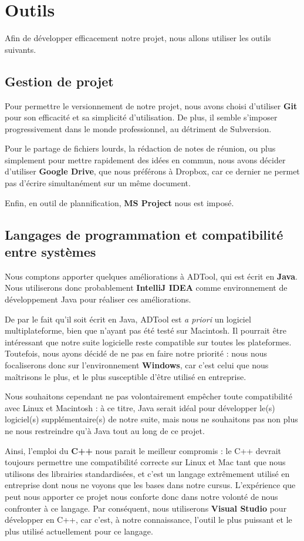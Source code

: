 \section{Outils}
	Afin de développer efficacement notre projet, nous allons utiliser les outils suivants.
	 
	\subsection{Gestion de projet}
		Pour permettre le versionnement de notre projet, nous avons choisi d'utiliser {\bf Git} pour son efficacité et sa simplicité d'utilisation. De plus, il semble s'imposer progressivement dans le monde professionnel, au détriment de Subversion.
		
		Pour le partage de fichiers lourds, la rédaction de notes de réunion, ou plus simplement pour mettre rapidement des idées en commun, nous avons décider d'utiliser {\bf Google Drive}, que nous préférons à Dropbox, car ce dernier ne permet pas d'écrire simultanément sur un même document.

		Enfin, en outil de plannification, {\bf MS Project} nous est imposé.

	\subsection{Langages de programmation et compatibilité entre systèmes}
		Nous comptons apporter quelques améliorations à ADTool, qui est écrit en {\bf Java}. Nous utiliserons donc probablement {\bf IntelliJ IDEA} comme environnement de développement Java pour réaliser ces améliorations.
		
		De par le fait qu'il soit écrit en Java, ADTool est {\itshape a priori} un logiciel multiplateforme, bien que n'ayant pas été testé sur Macintosh. Il pourrait être intéressant que notre suite logicielle reste compatible sur toutes les plateformes. Toutefois, nous ayons décidé de ne pas en faire notre priorité : nous nous focaliserons donc sur l'environnement {\bf Windows}, car c'est celui que nous maîtrisons le plus, et le plus susceptible d'être utilisé en entreprise.
		
		Nous souhaitons cependant ne pas volontairement empêcher toute compatibilité avec Linux et Macintosh : à ce titre, Java serait idéal pour développer le(s) logiciel(s) supplémentaire(s) de notre suite, mais nous ne souhaitons pas non plus ne nous restreindre qu'à Java tout au long de ce projet.
		
		Ainsi, l'emploi du {\bf C++} nous parait le meilleur compromis : le C++ devrait toujours permettre une compatibilité correcte sur Linux et Mac tant que nous utilisons des librairies standardisées, et c'est un langage extrêmement utilisé en entreprise dont nous ne voyons que les bases dans notre cursus. L'expérience que peut nous apporter ce projet nous conforte donc dans notre volonté de nous confronter à ce langage. Par conséquent, nous utiliserons {\bf Visual Studio} pour développer en C++, car c'est, à notre connaissance, l'outil le plus puissant et le plus utilisé actuellement pour ce langage.

